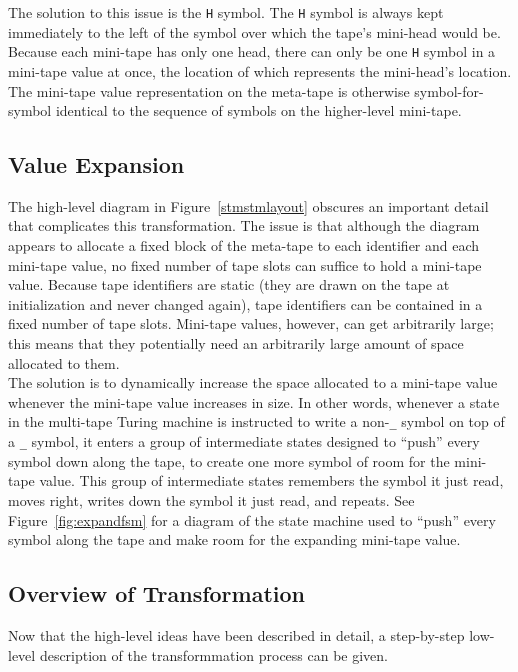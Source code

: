 \documentclass{report}
\begin{document}
The solution to this issue is the \texttt{H} symbol. The \texttt{H} symbol is always kept immediately to the left of the symbol over which the tape's mini-head would be. Because each mini-tape has only one head, there can only be one \texttt{H} symbol in a mini-tape value at once, the location of which represents the mini-head's location. The mini-tape value representation on the meta-tape is otherwise symbol-for-symbol identical to the sequence of symbols on the higher-level mini-tape.

\subsection{Value Expansion}

The high-level diagram in Figure~\ref{stmstmlayout} obscures an important detail that complicates this transformation. The issue is that although the diagram appears to allocate a fixed block of the meta-tape to each identifier and each mini-tape value, no fixed number of tape slots can suffice to hold a mini-tape value. Because tape identifiers are static (they are drawn on the tape at initialization and never changed again), tape identifiers can be contained in a fixed number of tape slots. Mini-tape values, however, can get arbitrarily large; this means that they potentially need an arbitrarily large amount of space allocated to them. \\

The solution is to dynamically increase the space allocated to a mini-tape value whenever the mini-tape value increases in size. In other words, whenever a state in the multi-tape Turing machine is instructed to write a non-\texttt{\_} symbol on top of a \texttt{\_} symbol, it enters a group of intermediate states designed to ``push'' every symbol down along the tape, to create one more symbol of room for the mini-tape value. This group of intermediate states remembers the symbol it just read, moves right, writes down the symbol it just read, and repeats. See Figure~\ref{fig:expandfsm} for a diagram of the state machine used to ``push'' every symbol along the tape and make room for the expanding mini-tape value. \\

\subsection{Overview of Transformation}

Now that the high-level ideas have been described in detail, a step-by-step low-level description of the transformmation process can be given. \\
\end{document}
